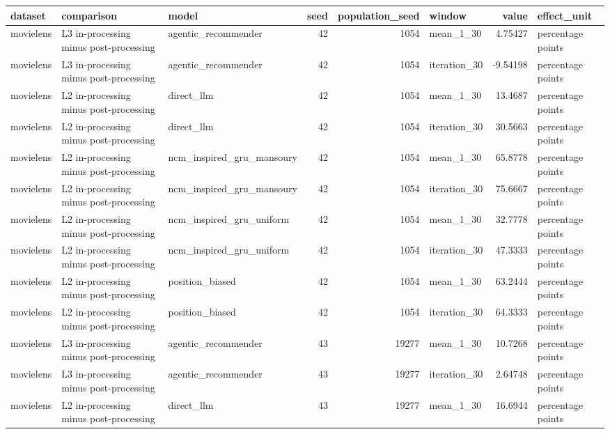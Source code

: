 \begin{table}[htbp!]
\centering
\small
\setlength{\tabcolsep}{3pt}
\renewcommand{\arraystretch}{1.1}
\begin{tabular}{lllrrlrl}
\hline
dataset & comparison & model & seed & population\_seed & window & value & effect\_unit \\
\hline
movielens & L3 in-processing minus post-processing & agentic\_recommender & 42 & 1054 & mean\_1\_30 & 4.75427 & percentage points \\
movielens & L3 in-processing minus post-processing & agentic\_recommender & 42 & 1054 & iteration\_30 & -9.54198 & percentage points \\
movielens & L2 in-processing minus post-processing & direct\_llm & 42 & 1054 & mean\_1\_30 & 13.4687 & percentage points \\
movielens & L2 in-processing minus post-processing & direct\_llm & 42 & 1054 & iteration\_30 & 30.5663 & percentage points \\
movielens & L2 in-processing minus post-processing & ncm\_inspired\_gru\_mansoury & 42 & 1054 & mean\_1\_30 & 65.8778 & percentage points \\
movielens & L2 in-processing minus post-processing & ncm\_inspired\_gru\_mansoury & 42 & 1054 & iteration\_30 & 75.6667 & percentage points \\
movielens & L2 in-processing minus post-processing & ncm\_inspired\_gru\_uniform & 42 & 1054 & mean\_1\_30 & 32.7778 & percentage points \\
movielens & L2 in-processing minus post-processing & ncm\_inspired\_gru\_uniform & 42 & 1054 & iteration\_30 & 47.3333 & percentage points \\
movielens & L2 in-processing minus post-processing & position\_biased & 42 & 1054 & mean\_1\_30 & 63.2444 & percentage points \\
movielens & L2 in-processing minus post-processing & position\_biased & 42 & 1054 & iteration\_30 & 64.3333 & percentage points \\
movielens & L3 in-processing minus post-processing & agentic\_recommender & 43 & 19277 & mean\_1\_30 & 10.7268 & percentage points \\
movielens & L3 in-processing minus post-processing & agentic\_recommender & 43 & 19277 & iteration\_30 & 2.64748 & percentage points \\
movielens & L2 in-processing minus post-processing & direct\_llm & 43 & 19277 & mean\_1\_30 & 16.6944 & percentage points \\

\end{tabular}
\end{table}
